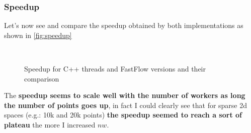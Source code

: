 \subsubsection{Speedup}
Let's now see and compare the speedup obtained by both implementations as shown in \autoref{fig:speedup}
\begin{figure}[H]
    \centering
    \\
    \caption{Speedup for C++ threads and FastFlow versions and their comparison}
    \label{fig:speedup}
\end{figure}
The \textbf{speedup seems to scale well with the number of workers as long the number of points goes up}, in fact I could clearly see that for sparse 2d spaces (e.g.: 10k and 20k points) \textbf{the speedup seemed to reach a sort of plateau} the more I increased $nw$.
\vspace{3mm}

